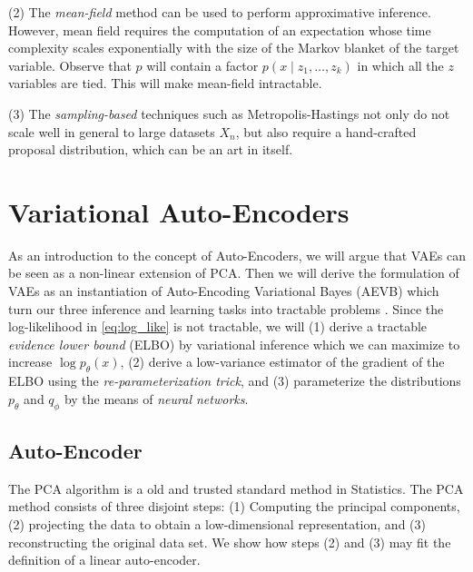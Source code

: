 \documentclass[11pt]{article}
\theoremstyle{plain}
\theoremstyle{definition}
\theoremstyle{plain}
\begin{document}
(2) The \textit{mean-field} method can be used to perform approximative
inference. However, mean field requires the computation of an expectation
whose time complexity scales exponentially with the size of the Markov
blanket of the target variable. Observe that $p$ will contain a factor
$p(x\mid z_{1},\ldots,z_{k})$ in which all the $z$ variables are
tied. This will make mean-field intractable.

(3) The \textit{sampling-based} techniques such as Metropolis-Hastings
not only do not scale well in general to large datasets $X_{n}$,
but also require a hand-crafted proposal distribution, which can be
an art in itself.

\section{Variational Auto-Encoders}

As an introduction to the concept of Auto-Encoders, we will argue
that VAEs can be seen as a non-linear extension of PCA. Then we will
derive the formulation of VAEs as an instantiation of Auto-Encoding
Variational Bayes (AEVB) which turn our three inference and learning
tasks into tractable problems \cite{journals/corr/KingmaW13}. Since
the log-likelihood in \eqref{eq:log_like} is not tractable, we will
(1) derive a tractable \textit{evidence lower bound} (ELBO) by variational
inference which we can maximize to increase $\log p_{\theta}(x)$,
(2) derive a low-variance estimator of the gradient of the ELBO using
the \textit{re-parameterization trick}, and (3) parameterize the distributions
$p_{\theta}$ and $q_{\phi}$ by the means of \textit{neural networks}.

\subsection{Auto-Encoder}

The PCA algorithm is a old and trusted standard method in Statistics.
The PCA method consists of three disjoint steps: (1) Computing the
principal components, (2) projecting the data to obtain a low-dimensional
representation, and (3) reconstructing the original data set. We show
how steps (2) and (3) may fit the definition of a linear auto-encoder.
\end{document}

